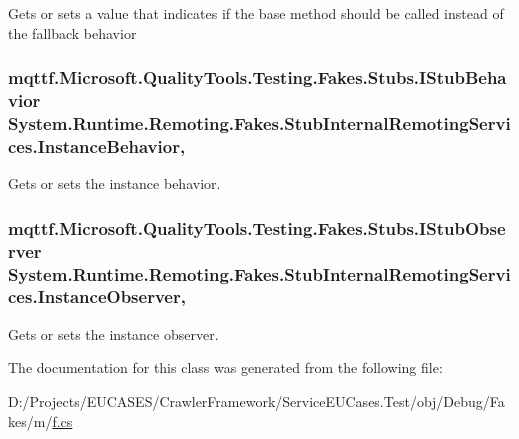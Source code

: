 Gets or sets a value that indicates if the base method should be called instead of the fallback behavior

\hypertarget{class_system_1_1_runtime_1_1_remoting_1_1_fakes_1_1_stub_internal_remoting_services_a1bb120bde9d70c1ab226ba063cb1f412}{
\subsubsection[{Instance\-Behavior}]{\setlength{\rightskip}{0pt plus 5cm}mqttf.\-Microsoft.\-Quality\-Tools.\-Testing.\-Fakes.\-Stubs.\-I\-Stub\-Behavior System.\-Runtime.\-Remoting.\-Fakes.\-Stub\-Internal\-Remoting\-Services.\-Instance\-Behavior\hspace{0.3cm}{\ttfamily [get]}, {\ttfamily [set]}}}\label{class_system_1_1_runtime_1_1_remoting_1_1_fakes_1_1_stub_internal_remoting_services_a1bb120bde9d70c1ab226ba063cb1f412}


Gets or sets the instance behavior.

\hypertarget{class_system_1_1_runtime_1_1_remoting_1_1_fakes_1_1_stub_internal_remoting_services_a55902da318f11b04d8b7e7612108d7bb}{
\subsubsection[{Instance\-Observer}]{\setlength{\rightskip}{0pt plus 5cm}mqttf.\-Microsoft.\-Quality\-Tools.\-Testing.\-Fakes.\-Stubs.\-I\-Stub\-Observer System.\-Runtime.\-Remoting.\-Fakes.\-Stub\-Internal\-Remoting\-Services.\-Instance\-Observer\hspace{0.3cm}{\ttfamily [get]}, {\ttfamily [set]}}}\label{class_system_1_1_runtime_1_1_remoting_1_1_fakes_1_1_stub_internal_remoting_services_a55902da318f11b04d8b7e7612108d7bb}


Gets or sets the instance observer.



The documentation for this class was generated from the following file\-:\begin{DoxyCompactItemize}
\item 
D\-:/\-Projects/\-E\-U\-C\-A\-S\-E\-S/\-Crawler\-Framework/\-Service\-E\-U\-Cases.\-Test/obj/\-Debug/\-Fakes/m/\hyperlink{m_2f_8cs}{f.\-cs}\end{DoxyCompactItemize}
